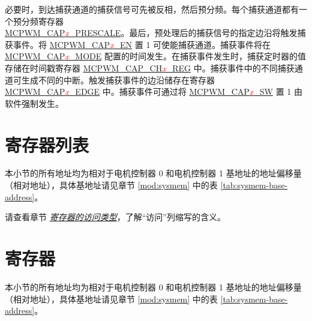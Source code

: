 \documentclass[main\_\_CN.tex]{subfiles}
\begin{document}
必要时，到达捕获通道的捕获信号可先被反相，然后预分频。每个捕获通道都有一个预分频寄存器 \\\hyperref[fielddesc:MCPWMCAP0PRESCALE]{MCPWM\_CAP\textcolor{red}{\it{x}}\_PRESCALE}。最后，预处理后的捕获信号的指定边沿将触发捕获事件。将 \hyperref[fielddesc:MCPWMCAP0EN]{MCPWM\_CAP\textcolor{red}{\it{x}}\_EN} 置 1 可使能捕获通道。捕获事件将在 \hyperref[fielddesc:MCPWMCAP0MODE]{MCPWM\_CAP\textcolor{red}{\it{x}}\_MODE} 配置的时间发生。在捕获事件发生时，捕获定时器的值存储在时间戳寄存器 \hyperref[regdesc:MCPWMCAPCH0REG]{MCPWM\_CAP\_CH\textcolor{red}{\it{x}}\_REG} 中。捕获事件中的不同捕获通道可生成不同的中断。触发捕获事件的边沿储存在寄存器 \hyperref[fielddesc:MCPWMCAP0EDGE]{MCPWM\_CAP\textcolor{red}{\it{x}}\_EDGE} 中。捕获事件可通过将 \hyperref[fielddesc:MCPWMCAP0SW]{MCPWM\_CAP\textcolor{red}{\it{x}}\_SW} 置 1 由软件强制发生。



\clearpage
\hypertarget{mcpwm-reg-summ}{}
\section{寄存器列表}
\label{sec:mcpwm-reg-summ}

本小节的所有地址均为相对于电机控制器 0 和电机控制器 1 基地址的地址偏移量（相对地址），具体基地址请见章节 \ref{mod:sysmem} \textit{} 中的表 \ref{tab:sysmem-base-address}。

请查看章节 \hyperref[glossary-access-types]{\textit{寄存器的访问类型}}，了解“访问”列缩写的含义。






\clearpage
\section{寄存器}

本小节的所有地址均为相对于电机控制器 0 和电机控制器 1 基地址的地址偏移量（相对地址），具体基地址请见章节 \ref{mod:sysmem} \textit{} 中的表 \ref{tab:sysmem-base-address}。


\end{document}
